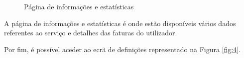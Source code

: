 \begin{figure}[ht!]
\centering
{}
\caption{Página de informações e estatísticas}
\label{fig:3}
\end{figure}


A página de informações e estatísticas é onde estão disponíveis vários dados referentes ao serviço e detalhes das faturas do utilizador.\par
Por fim, é possível aceder ao ecrã de definições representado na Figura \ref{fig:4}.


